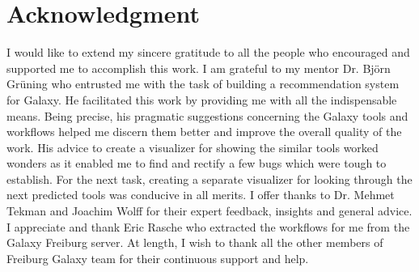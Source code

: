 \chapter*{Acknowledgment}

I would like to extend my sincere gratitude to all the people who encouraged and supported me to accomplish this work. I am grateful to my mentor Dr. Björn Grüning who entrusted me with the task of building a recommendation system for Galaxy. He facilitated this work by providing me with all the indispensable means. Being precise, his pragmatic suggestions concerning the Galaxy tools and workflows helped me discern them better and improve the overall quality of the work. His advice to create a visualizer for showing the similar tools worked wonders as it enabled me to find and rectify a few bugs which were tough to establish. For the next task, creating a separate visualizer for looking through the next predicted tools was conducive in all merits. I offer thanks to Dr. Mehmet Tekman and Joachim Wolff for their expert feedback, insights and general advice. I appreciate and thank Eric Rasche who extracted the workflows for me from the Galaxy Freiburg server. At length, I wish to thank all the other members of Freiburg Galaxy team for their continuous support and help.

